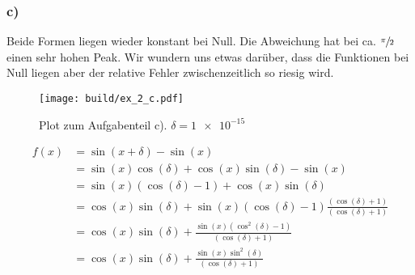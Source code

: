 \subsubsection*{c)}
Beide Formen liegen wieder konstant bei Null. 
Die Abweichung hat bei ca. $\sfrac{\pi}{2}$ einen sehr hohen Peak.
Wir wundern uns etwas darüber, dass die Funktionen bei Null liegen aber der relative Fehler zwischenzeitlich so riesig wird.
\begin{figure}
    \centering
    \texttt{[image: build/ex\_2\_c.pdf]}
    \caption{Plot zum Aufgabenteil c). $\delta = \num{1e-15}$}
    \label{fig:c}
\end{figure}
\begin{align*}
    f(x) &= \sin(x + \delta) - \sin(x)                                                              \\
    &= \sin(x) \cos(\delta) + \cos(x) \sin (\delta) - \sin(x)                                       \\
    &= \sin(x) (\cos(\delta) -1) + \cos(x) \sin(\delta)                                             \\
    &= \cos(x) \sin(\delta) + \sin(x) (\cos(\delta) -1) \frac{(\cos(\delta) +1)}{(\cos(\delta) +1)} \\
    &= \cos(x) \sin(\delta) + \frac{\sin(x) (\cos^2(\delta) - 1)}{(\cos(\delta) +1)}                \\
    &= \cos(x) \sin(\delta) + \frac{\sin(x) \sin^2(\delta)}{(\cos(\delta) +1)}                      \\
\end{align*}  
